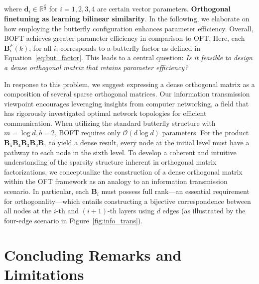 where $\bm{d}_i\in\mathbb{R}^{\frac{k}{2}}$ for $i=1,2,3,4$ are certain vector parameters. \textbf{Orthogonal finetuning as learning bilinear similarity}. In the following, we elaborate on how employing the butterfly configuration enhances parameter efficiency. Overall, BOFT achieves greater parameter efficiency in comparison to OFT. Here, each $\bm{B}^F_i(k)$, for all $i$, corresponds to a butterfly factor as defined in Equation~\ref{eq:but_factor}. This leads to a central question: \emph{Is it feasible to design a dense orthogonal matrix that retains parameter efficiency?}

In response to this problem, we suggest expressing a dense orthogonal matrix as a composition of several sparse orthogonal matrices. Our information transmission viewpoint encourages leveraging insights from computer networking, a field that has rigorously investigated optimal network topologies for efficient communication. When utilizing the standard butterfly structure with $m=\log d, b=2$, BOFT requires only $\mathcal{O}(d\log d)$ parameters. For the product $\bm{B}_5\bm{B}_4\bm{B}_3\bm{B}_2\bm{B}_1$ to yield a dense result, every node at the initial level must have a pathway to each node in the sixth level. To develop a coherent and intuitive understanding of the sparsity structure inherent in orthogonal matrix factorizations, we conceptualize the construction of a dense orthogonal matrix within the OFT framework as an analogy to an information transmission scenario. In particular, each $\bm{B}_i$ must possess full rank—an essential requirement for orthogonality—which entails constructing a bijective correspondence between all nodes at the $i$-th and $(i+1)$-th layers using $d$ edges (as illustrated by the four-edge scenario in Figure~\ref{fig:info_trans}). 

\section{Concluding Remarks and Limitations}

